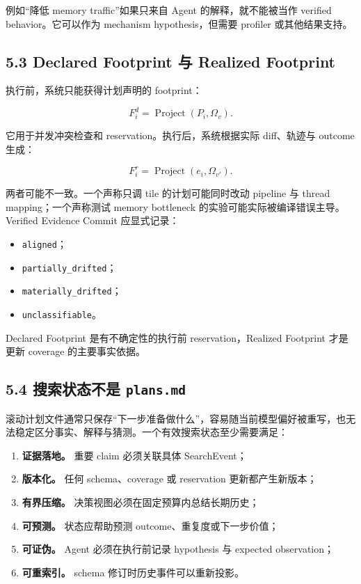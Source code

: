 \documentclass[
  11pt]{ctexart}
\providecommand{\tightlist}{%
  \setlength{\itemsep}{0pt}\setlength{\parskip}{0pt}}
\begin{document}
例如``降低 memory traffic''如果只来自 Agent 的解释，就不能被当作
verified behavior。它可以作为 mechanism hypothesis，但需要 profiler
或其他结果支持。

\subsection{5.3 Declared Footprint 与 Realized
Footprint}\label{declared-footprint-ux4e0e-realized-footprint}

执行前，系统只能获得计划声明的 footprint：

\[
F_i^{d}=\operatorname{Project}(P_i,\Omega_v).
\]

它用于并发冲突检查和 reservation。执行后，系统根据实际 diff、轨迹与
outcome 生成：

\[
F_i^{r}=\operatorname{Project}(e_i,\Omega_{v'}).
\]

两者可能不一致。一个声称只调 tile 的计划可能同时改动 pipeline 与 thread
mapping；一个声称测试 memory bottleneck
的实验可能实际被编译错误主导。Verified Evidence Commit 应显式记录：

\begin{itemize}
\tightlist
\item
  \texttt{aligned}；
\item
  \texttt{partially\_drifted}；
\item
  \texttt{materially\_drifted}；
\item
  \texttt{unclassifiable}。
\end{itemize}

Declared Footprint 是有不确定性的执行前 reservation，Realized Footprint
才是更新 coverage 的主要事实依据。

\subsection{\texorpdfstring{5.4 搜索状态不是
\texttt{plans.md}}{5.4 搜索状态不是 plans.md}}\label{ux641cux7d22ux72b6ux6001ux4e0dux662f-plans.md}

滚动计划文件通常只保存``下一步准备做什么''，容易随当前模型偏好被重写，也无法稳定区分事实、解释与猜测。一个有效搜索状态至少需要满足：

\begin{enumerate}
\def\labelenumi{\arabic{enumi}.}
\tightlist
\item
  \textbf{证据落地。} 重要 claim 必须关联具体 SearchEvent；
\item
  \textbf{版本化。} 任何 schema、coverage 或 reservation
  更新都产生新版本；
\item
  \textbf{有界压缩。} 决策视图必须在固定预算内总结长期历史；
\item
  \textbf{可预测。} 状态应帮助预测 outcome、重复度或下一步价值；
\item
  \textbf{可证伪。} Agent 必须在执行前记录 hypothesis 与 expected
  observation；
\item
  \textbf{可重索引。} schema 修订时历史事件可以重新投影。
\end{enumerate}
\end{document}
